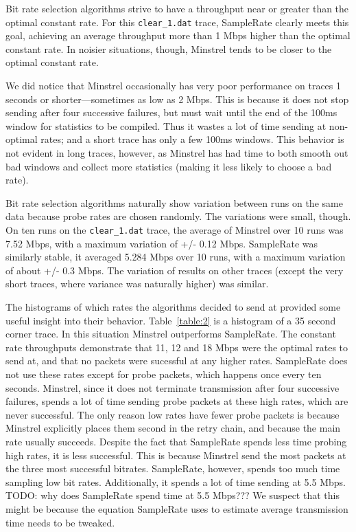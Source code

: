 \documentclass[letterpaper,twocolumn,10pt]{article}
\begin{document}
Bit rate selection algorithms strive to have a throughput near or
greater than the optimal constant rate. For this \texttt{clear\_1.dat}
trace, SampleRate clearly meets this goal, achieving an average
throughput more than 1 Mbps higher than the optimal constant rate. In
noisier situations, though, Minstrel tends to be closer to the optimal
constant rate.

We did notice that Minstrel occasionally has very poor performance on
traces 1 seconds or shorter---sometimes as low as 2 Mbps. This is
because it does not stop sending after four successive failures, but
must wait until the end of the 100ms window for statistics to be
compiled. Thus it wastes a lot of time sending at non-optimal rates;
and a short trace has only a few 100ms windows. This behavior is not
evident in long traces, however, as Minstrel has had time to both
smooth out bad windows and collect more statistics (making it less
likely to choose a bad rate).

Bit rate selection algorithms naturally show variation between runs on
the same data because probe rates are chosen randomly. The variations
were small, though. On ten runs on the \texttt{clear\_1.dat} trace,
the average of Minstrel over 10 runs was 7.52 Mbps, with a maximum
variation of +/- 0.12 Mbps. SampleRate was similarly stable, it
averaged 5.284 Mbps over 10 runs, with a maximum variation of about
+/- 0.3 Mbps. The variation of results on other traces (except the
very short traces, where variance was naturally higher) was similar.

The histograms of which rates the algorithms decided to send at
provided some useful insight into their behavior. Table~\ref{table:2}
is a histogram of a 35 second corner trace. In this situation Minstrel
outperforms SampleRate. The constant rate throughputs demonstrate that
11, 12 and 18 Mbps were the optimal rates to send at, and that no
packets were sucessful at any higher rates. SampleRate does not use
these rates except for probe packets, which happens once every ten
seconds. Minstrel, since it does not terminate transmission after four
successive failures, spends a lot of time sending probe packets at
these high rates, which are never successful. The only reason low
rates have fewer probe packets is because Minstrel explicitly places
them second in the retry chain, and because the main rate usually
succeeds. Despite the fact that SampleRate spends less time probing
high rates, it is less successful. This is because Minstrel send the
most packets at the three most successful bitrates. SampleRate,
however, spends too much time sampling low bit rates. Additionally, it
spends a lot of time sending at 5.5 Mbps. TODO: why does SampleRate
spend time at 5.5 Mbps??? We suspect that this might be because the
equation SampleRate uses to estimate average transmission time needs
to be tweaked.
\end{document}
